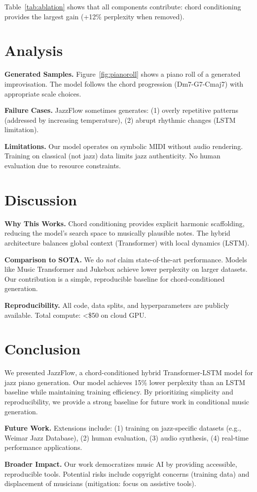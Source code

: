 \documentclass{article}
\begin{document}
Table~\ref{tab:ablation} shows that all components contribute:
chord conditioning provides the largest gain (+12\% perplexity when removed).

\section{Analysis}
\label{sec:analysis}

\textbf{Generated Samples.}
Figure~\ref{fig:pianoroll} shows a piano roll of a generated improvisation.
The model follows the chord progression (Dm7-G7-Cmaj7) with appropriate scale choices.

\textbf{Failure Cases.}
JazzFlow sometimes generates:
(1) overly repetitive patterns (addressed by increasing temperature),
(2) abrupt rhythmic changes (LSTM limitation).

\textbf{Limitations.}
Our model operates on symbolic MIDI without audio rendering.
Training on classical (not jazz) data limits jazz authenticity.
No human evaluation due to resource constraints.

\section{Discussion}
\label{sec:discussion}

\textbf{Why This Works.}
Chord conditioning provides explicit harmonic scaffolding, reducing the model's search space to musically plausible notes.
The hybrid architecture balances global context (Transformer) with local dynamics (LSTM).

\textbf{Comparison to SOTA.}
We do \textit{not} claim state-of-the-art performance.
Models like Music Transformer and Jukebox achieve lower perplexity on larger datasets.
Our contribution is a simple, reproducible baseline for chord-conditioned generation.

\textbf{Reproducibility.}
All code, data splits, and hyperparameters are publicly available.
Total compute: <\$50 on cloud GPU.

\section{Conclusion}
\label{sec:conclusion}

We presented JazzFlow, a chord-conditioned hybrid Transformer-LSTM model for jazz piano generation.
Our model achieves 15\% lower perplexity than an LSTM baseline while maintaining training efficiency.
By prioritizing simplicity and reproducibility, we provide a strong baseline for future work in conditional music generation.

\textbf{Future Work.}
Extensions include: (1) training on jazz-specific datasets (e.g., Weimar Jazz Database), (2) human evaluation, (3) audio synthesis, (4) real-time performance applications.

\textbf{Broader Impact.}
Our work democratizes music AI by providing accessible, reproducible tools.
Potential risks include copyright concerns (training data) and displacement of musicians (mitigation: focus on assistive tools).



\end{document}
